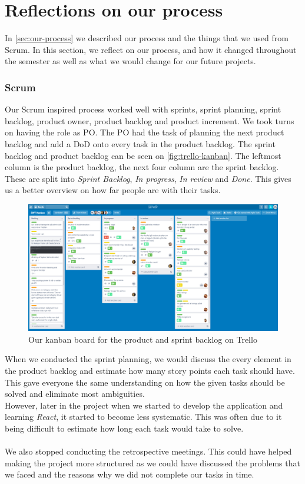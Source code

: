 \section{Reflections on our process}
In \autoref{sec:our-process} we described our process and the things that we used from Scrum.
In this section, we reflect on our process, and how it changed throughout the semester as well as what we would change for our future projects.

\subsubsection{Scrum}
Our Scrum inspired process worked well with sprints, sprint planning, sprint backlog, product owner, product backlog and product increment.
We took turns on having the role as PO.
The PO had the task of planning the next product backlog and add a DoD onto every task in the product backlog.
The sprint backlog and product backlog can be seen on \autoref{fig:trello-kanban}. 
The leftmost column is the product backlog, the next four column are the sprint backlog.
These are split into \textit{Sprint Backlog}, \textit{In progress}, \textit{In review} and \textit{Done}.
This gives us a better overview on how far people are with their tasks.

\begin{figure}[H]
    \centering
    \includegraphics[width=0.8\linewidth]{figures/trellopicture.PNG}
    \caption{Our kanban board for the product and sprint backlog on Trello}
    \label{fig:trello-kanban}
\end{figure}
\noindent
When we conducted the sprint planning, we would discuss the every element in the product backlog and estimate how many story points each task should have.
This gave everyone the same understanding on how the given tasks should be solved and eliminate most ambiguities. 
\\
However, later in the project when we started to develop the application and learning \textit{React}, it started to become less systematic.
This was often due to it being difficult to estimate how long each task would take to solve.
\\\\
We also stopped conducting the retrospective meetings. 
This could have helped making the project more structured as we could have discussed the problems that we faced and the reasons why we did not complete our tasks in time.

